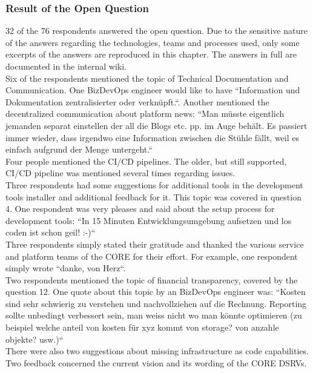 \documentclass[a4paper,10pt]{article}
\begin{document}
    \subsubsection{Result of the Open Question}
    \label{sssec:ropque}
    32 of the 76 respondents answered the open question.
    Due to the sensitive nature of the answers regarding the technologies, teams and processes used, only some excerpts
    of the answers are reproduced in this chapter.
    The answers in full are documented in the internal wiki\parencite{sbbdevopsexperience}.\\
    Six of the respondents mentioned the topic of Technical Documentation and Communication.
    One BizDevOps engineer would like to have ``Information und Dokumentation zentralisierter oder verknüpft.``.
    Another mentioned the decentralized communication about platform news: ``Man müsste eigentlich jemanden separat einstellen
    der all die Blogs etc. pp. im Auge behält. Es passiert immer wieder, dass irgendwo eine Information zwischen die
    Stühle fällt, weil es einfach aufgrund der Menge untergeht.``\\
    Four people mentioned the CI/CD pipelines.
    The older, but still supported, CI/CD pipeline was mentioned several times regarding issues. \\
    Three respondents had some suggestions for additional tools in the development tools installer and additional
    feedback for it.
    This topic was covered in question 4.
    One respondent was very pleases and said about the setup process for development tools: ``In 15 Minuten
    Entwicklungsumgebung aufsetzen und los coden ist schon geil! :-)``\\
    Three respondents simply stated their gratitude and thanked the various service and platform teams of the CORE for
    their effort.
    For example, one respondent simply wrote ``danke, von Herz``.\\
    Two respondents mentioned the topic of financial transparency, covered by the question 12.
    One quote about this topic by an BizDevOps engineer was: ``Kosten sind sehr schwierig zu verstehen und nachvollziehen auf die Rechnung. Reporting
    sollte unbedingt verbessert sein, man weiss nicht wo man könnte optimieren (zu beispiel welche anteil von kosten für
    xyz kommt von storage? von anzahle objekte? usw.)``\\
    There were also two suggestions about missing infrastructure as code capabilities.\\
    Two feedback concerned the current vision and its wording of the CORE DSRVs.\\
\end{document}
